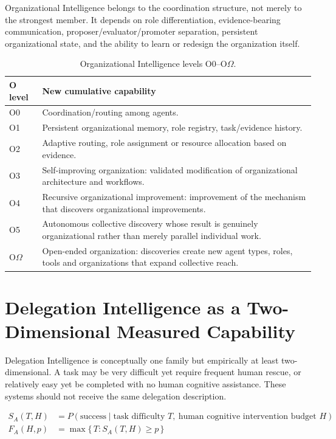 \documentclass[11pt]{article}
\theoremstyle{definition}
\newcommand{\Om}{\ensuremath{\Omega}}
\newcommand{\SA}{\ensuremath{S_A(T,H)}}
\newcommand{\FA}{\ensuremath{F_A(H,p)}}
\begin{document}
Organizational Intelligence belongs to the coordination structure, not merely to the strongest member. It depends on role differentiation, evidence-bearing communication, proposer/evaluator/promoter separation, persistent organizational state, and the ability to learn or redesign the organization itself.

\begin{table}[H]
\centering\small
\begin{tabularx}{\textwidth}{@{}lY@{}}
\toprule
O level & New cumulative capability \\
\midrule
O0 & Coordination/routing among agents. \\
O1 & Persistent organizational memory, role registry, task/evidence history. \\
O2 & Adaptive routing, role assignment or resource allocation based on evidence. \\
O3 & Self-improving organization: validated modification of organizational architecture and workflows. \\
O4 & Recursive organizational improvement: improvement of the mechanism that discovers organizational improvements. \\
O5 & Autonomous collective discovery whose result is genuinely organizational rather than merely parallel individual work. \\
O\Om{} & Open-ended organization: discoveries create new agent types, roles, tools and organizations that expand collective reach. \\
\bottomrule
\end{tabularx}
\caption{Organizational Intelligence levels O0--O\Om{}.}
\label{tab:o}
\end{table}

\section{Delegation Intelligence as a Two-Dimensional Measured Capability}

Delegation Intelligence is conceptually one family but empirically at least two-dimensional. A task may be very difficult yet require frequent human rescue, or relatively easy yet be completed with no human cognitive assistance. These systems should not receive the same delegation description.

\begin{align}
\SA{} &= P(\text{success} \mid \text{task difficulty } T,\ \text{human cognitive intervention budget } H)\\
\FA{} &= \max\{\,T : \SA{} \ge p\,\}
\end{align}
\end{document}

